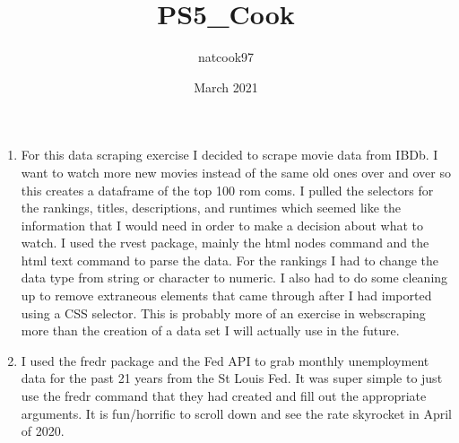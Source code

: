 \documentclass{article}
\title{PS5_Cook}
\author{natcook97 }
\date{March 2021}
\begin{document}
\maketitle

\begin{enumerate}
    \item For this data scraping exercise I decided to scrape movie data from IBDb. I want to watch more new movies instead of the same old ones over and over so this creates a dataframe of the top 100 rom coms. I pulled the selectors for the rankings, titles, descriptions, and runtimes which seemed like the information that I would need in order to make a decision about what to watch. I used the rvest package, mainly the html nodes command and the html text command to parse the data. For the rankings I had to change the data type from string or character to numeric. I also had to do some cleaning up to remove extraneous elements that came through after I had imported using a CSS selector. This is probably more of an exercise in webscraping more than the creation of a data set I will actually use in the future.  
    
    \item I used the fredr package and the Fed API to grab monthly unemployment data for the past 21 years from the St Louis Fed. It was super simple to just use the fredr command that they had created and fill out the appropriate arguments. It is fun/horrific to scroll down and see the rate skyrocket in April of 2020.
\end{enumerate}
\end{document}
